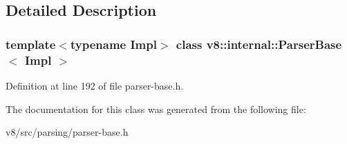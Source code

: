 \subsection{Detailed Description}
\subsubsection*{template$<$typename Impl$>$\newline
class v8\+::internal\+::\+Parser\+Base$<$ Impl $>$}



Definition at line 192 of file parser-\/base.\+h.



The documentation for this class was generated from the following file\+:\begin{DoxyCompactItemize}
\item 
v8/src/parsing/parser-\/base.\+h\end{DoxyCompactItemize}
